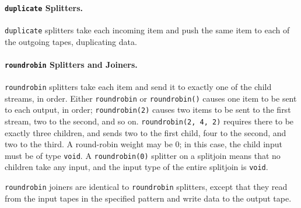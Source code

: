 \documentclass[11pt]{article}
\newcommand{\new}{\marginpar{\footnotesize \textbf{~~--~New~--}}}
\begin{document}


\paragraph{\lstinline|duplicate| Splitters.} \lstinline|duplicate| 
splitters take each incoming item and push the same item to each of
the outgoing tapes, duplicating data.

\paragraph{\lstinline|roundrobin| Splitters and Joiners.}  \lstinline|roundrobin| 
splitters take each item and send it to exactly one of the child
streams, in order.  Either \lstinline|roundrobin| or
\lstinline|roundrobin()| causes one item to be sent to each output, in
order; \lstinline|roundrobin(2)| causes two items to be sent to the
first stream, two to the second, and so on.  \lstinline|roundrobin(2, 4, 2)| 
requires there to be exactly three children, and sends two to
the first child, four to the second, and two to the third.  A
round-robin weight may be 0; in this case, the child input must be of
type \lstinline|void|.  A \lstinline|roundrobin(0)| splitter on a
splitjoin means that no children take any input, and the input type
of the entire splitjoin is \lstinline|void|.

\lstinline|roundrobin| joiners are identical to \lstinline|roundrobin|
splitters, except that they read from the input tapes in the specified
pattern and write data to the output tape.

\end{document}
